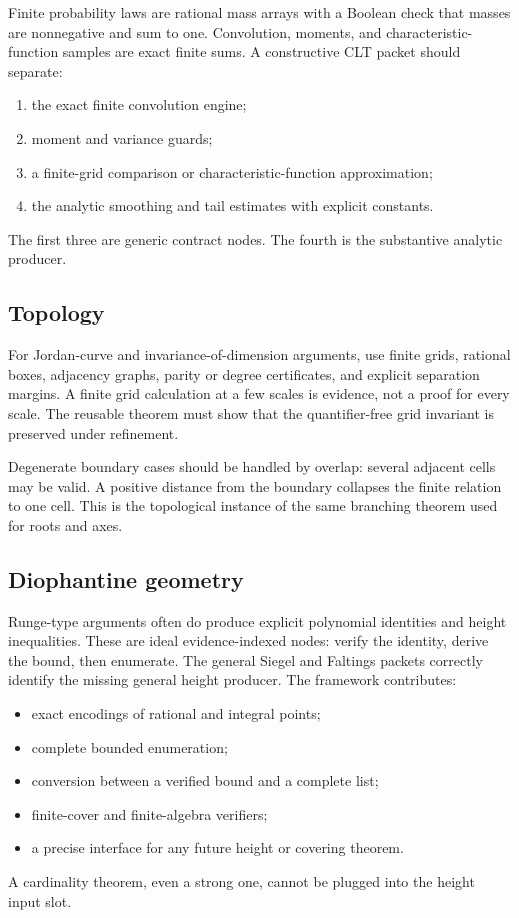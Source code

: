 Finite probability laws are rational mass arrays with a Boolean check that
masses are nonnegative and sum to one.  Convolution, moments, and
characteristic-function samples are exact finite sums.  A constructive CLT
packet should separate:
\begin{enumerate}[label=(\roman*)]
\item the exact finite convolution engine;
\item moment and variance guards;
\item a finite-grid comparison or characteristic-function approximation;
\item the analytic smoothing and tail estimates with explicit constants.
\end{enumerate}
The first three are generic contract nodes.  The fourth is the substantive
analytic producer.

\subsection{Topology}

For Jordan-curve and invariance-of-dimension arguments, use finite grids,
rational boxes, adjacency graphs, parity or degree certificates, and explicit
separation margins.  A finite grid calculation at a few scales is evidence,
not a proof for every scale.  The reusable theorem must show that the
quantifier-free grid invariant is preserved under refinement.

Degenerate boundary cases should be handled by overlap: several adjacent
cells may be valid.  A positive distance from the boundary collapses the
finite relation to one cell.  This is the topological instance of the same
branching theorem used for roots and axes.

\subsection{Diophantine geometry}

Runge-type arguments often do produce explicit polynomial identities and
height inequalities.  These are ideal evidence-indexed nodes: verify the
identity, derive the bound, then enumerate.  The general Siegel and Faltings
packets correctly identify the missing general height producer.  The
framework contributes:
\begin{itemize}[leftmargin=1.6em]
\item exact encodings of rational and integral points;
\item complete bounded enumeration;
\item conversion between a verified bound and a complete list;
\item finite-cover and finite-algebra verifiers;
\item a precise interface for any future height or covering theorem.
\end{itemize}
A cardinality theorem, even a strong one, cannot be plugged into the height
input slot.

